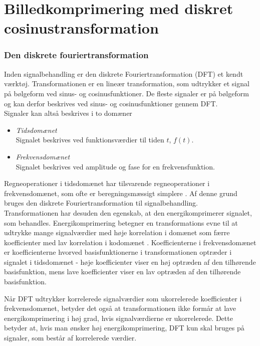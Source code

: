 \chapter{Billedkomprimering med diskret cosinustransformation}

\subsection{Den diskrete fouriertransformation}
Inden signalbehandling er den diskrete Fouriertransformation (DFT) et kendt værktøj. Transformationen er en lineær transformation, som udtrykker et signal på bølgeform ved sinus- og cosinusfunktioner\citep{thefouriertransform}. De fleste signaler er på bølgeform og kan derfor beskrives ved sinus- og cosinusfunktioner gennem DFT.\\
Signaler kan altså beskrives i to domæner
\begin{itemize}
	\item{\textit{Tidsdomænet}\\
	Signalet beskrives ved funktionsværdier til tiden $t$, $f(t)$.}
	\item{\textit{Frekvensdomænet}\\
	Signalet beskrives ved amplitude og fase for en frekvensfunktion.}
\end{itemize}
Regneoperationer i tidsdomænet har tilsvarende regneoperationer i frekvensdomænet, som ofte er beregningsmæssigt simplere \citep{nbtwiki}. Af denne grund bruges den diskrete Fouriertransformation til signalbehandling.\\
Transformationen har desuden den egenskab, at den energikomprimerer signalet, som behandles. Energikomprimering betegner en transformations evne til at udtrykke mange signalværdier med høje korrelation i domænet som færre koefficienter med lav korrelation i kodomænet \citep{smcnus_energy}. Koefficienterne i frekvensdomænet er koefficienterne hvorved basisfunktionerne i transformationen optræder i signalet i tidsdomænet - høje koefficienter viser en høj optræden af den tilhørende basisfunktion, mens lave koefficienter viser en lav optræden af den tilhørende basisfunktion.

Når DFT udtrykker korrelerede signalværdier som ukorrelerede koefficienter i frekvensdomænet, betyder det også at transformationen ikke formår at lave energikomprimering i høj grad, hvis signalværdierne er ukorrelerede. Dette betyder at, hvis man ønsker høj energikomprimering, DFT kun skal bruges på signaler, som består af korrelerede værdier.

